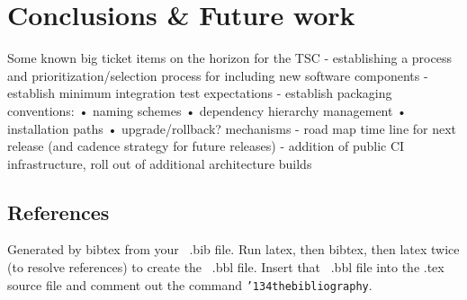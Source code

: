\documentclass{sig-alternate-05-2015}
\begin{document}
\section{Conclusions \& Future work}
Some known big ticket items on the horizon for the TSC
- establishing a process and prioritization/selection process for including
new software components
- establish minimum integration test expectations
- establish packaging conventions:
• naming schemes
• dependency hierarchy management • installation paths
• upgrade/rollback? mechanisms
- road map time line for next release (and cadence strategy for future releases)
- addition of public CI infrastructure, roll out of additional architecture builds






\subsection{References}
Generated by bibtex from your ~.bib file.  Run latex,
then bibtex, then latex twice (to resolve references)
to create the ~.bbl file.  Insert that ~.bbl file into
the .tex source file and comment out
the command \texttt{{\char'134}thebibliography}.
\end{document}

